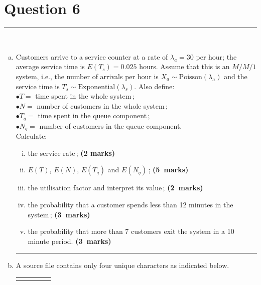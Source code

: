 \documentclass[12pt]{article}
\begin{document}
\section*{Question 6 }
\noindent\rule{\linewidth}{1pt}
\quad\\[-0.5cm]
\begin{enumerate}[a)]
\item Customers arrive to a service counter at a rate of $\lambda_a=30$ per hour; the average service time is $E(T_s) = 0.025$ hours. Assume that this is an $M/M/1$ system, i.e., the number of arrivals per hour is $X_a \sim \text{Poisson}(\lambda_a)$ and the service time is $T_s \sim \text{Exponential}(\lambda_s)$. Also define:\\[0.2cm]
    \phantom{a}\qquad\qquad$\bullet$\quad $T=$ time spent in the whole system\,;\\[0.2cm]
    \phantom{a}\qquad\qquad$\bullet$\quad  $N=$ number of customers in the whole system\,;\\[0.2cm]
    \phantom{a}\qquad\qquad$\bullet$\quad  $T_q=$ time spent in the queue component\,;\\[0.2cm]
    \phantom{a}\qquad\qquad$\bullet$\quad  $N_q=$ number of customers in the queue component.\\[0.4cm]
    Calculate:
    \begin{enumerate}[i)]\itemsep0.2cm
    \item the service rate\,; \hfill{\scriptsize \bf (2 marks)}
    \item $E(T)$, $E(N)$, $E(T_q)$ and $E(N_q)$\,; \hfill{\mbox{\scriptsize \bf (5 marks)}}
     \item the utilisation factor and interpret its value\,; \hfill{\mbox{\scriptsize \bf (2 marks)}}
     \item the probability that a customer spends less than 12 minutes in the system\,; \hfill{\mbox{\scriptsize \bf (3 marks)}}
     \item the probability that more than 7 customers exit the system in a 10 minute period. \hfill{\mbox{\scriptsize \bf (3 marks)}}
    \end{enumerate}
\begin{center}\noindent\rule{0.4\linewidth}{0.5pt}\end{center}
\item A source file contains only four unique characters as indicated below.\quad
\begin{center}
\begin{tabular}{|c|cccc|}
\hline
&&&&\\[-0.4cm]

\end{tabular}
\end{center}
\end{enumerate}
\end{document}

